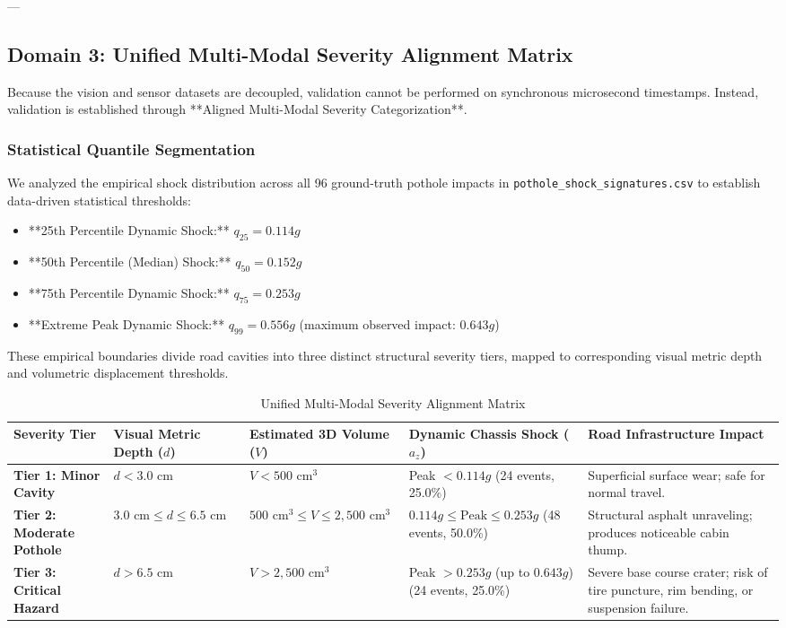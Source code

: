 ---

\subsection{Domain 3: Unified Multi-Modal Severity Alignment Matrix}
Because the vision and sensor datasets are decoupled, validation cannot be performed on synchronous microsecond timestamps. Instead, validation is established through **Aligned Multi-Modal Severity Categorization**.

\subsubsection{Statistical Quantile Segmentation}
We analyzed the empirical shock distribution across all 96 ground-truth pothole impacts in \texttt{pothole\_shock\_signatures.csv} to establish data-driven statistical thresholds:
\begin{itemize}
    \item **25th Percentile Dynamic Shock:** $q_{25} = 0.114g$
    \item **50th Percentile (Median) Shock:** $q_{50} = 0.152g$
    \item **75th Percentile Dynamic Shock:** $q_{75} = 0.253g$
    \item **Extreme Peak Dynamic Shock:** $q_{99} = 0.556g$ (maximum observed impact: $0.643g$)
\end{itemize}

These empirical boundaries divide road cavities into three distinct structural severity tiers, mapped to corresponding visual metric depth and volumetric displacement thresholds.

\begin{table}[htbp]
\centering
\small
\caption{Unified Multi-Modal Severity Alignment Matrix}
\label{tab:severity_matrix}
\begin{tabularx}{\textwidth}{lp{3.2cm}p{3.2cm}p{3.2cm}X}
\toprule
\textbf{Severity Tier} & \textbf{Visual Metric Depth ($d$)} & \textbf{Estimated 3D Volume ($V$)} & \textbf{Dynamic Chassis Shock ($a_z$)} & \textbf{Road Infrastructure Impact} \\
\midrule
\textbf{Tier 1: Minor Cavity} & $d < 3.0\text{ cm}$ & $V < 500\text{ cm}^3$ & Peak $< 0.114g$ (24 events, 25.0\%) & Superficial surface wear; safe for normal travel. \\
\addlinespace
\textbf{Tier 2: Moderate Pothole} & $3.0\text{ cm} \le d \le 6.5\text{ cm}$ & $500\text{ cm}^3 \le V \le 2,500\text{ cm}^3$ & $0.114g \le \text{Peak} \le 0.253g$ (48 events, 50.0\%) & Structural asphalt unraveling; produces noticeable cabin thump. \\
\addlinespace
\textbf{Tier 3: Critical Hazard} & $d > 6.5\text{ cm}$ & $V > 2,500\text{ cm}^3$ & Peak $> 0.253g$ (up to $0.643g$) (24 events, 25.0\%) & Severe base course crater; risk of tire puncture, rim bending, or suspension failure. \\
\bottomrule
\end{tabularx}
\end{table}


